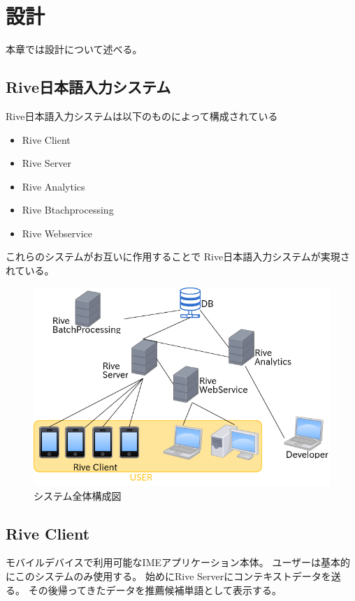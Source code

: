 \chapter{設計}
\label{chap:design}
本章では設計について述べる。

\newpage
\section{Rive日本語入力システム}
Rive日本語入力システムは以下のものによって構成されている
\begin{itemize}
  \item Rive Client
  \item Rive Server
  \item Rive Analytics
  \item Rive Btachprocessing
  \item Rive Webservice
\end{itemize}
これらのシステムがお互いに作用することで
Rive日本語入力システムが実現されている。
\begin{figure}[htbp]
  \begin{center}
    \includegraphics[width=12cm,bb=0 0 540 448]{images/systemstructure.png}
  \end{center}
  \caption{システム全体構成図}
  \label{fig:systemstructure}
\end{figure}

\section{Rive Client}
モバイルデバイスで利用可能なIMEアプリケーション本体。
ユーザーは基本的にこのシステムのみ使用する。
始めにRive Serverにコンテキストデータを送る。
その後帰ってきたデータを推薦候補単語として表示する。

